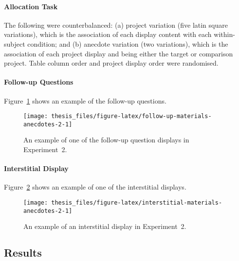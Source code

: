 \documentclass[a4paper, nobind]{templates/ociamthesis}
\theoremstyle{definition}
\theoremstyle{definition}
\theoremstyle{definition}
\theoremstyle{definition}
\theoremstyle{remark}
\begin{document}
\hypertarget{allocation-anecdotes-2-appendix}{%
\paragraph{Allocation Task}\label{allocation-anecdotes-2-appendix}}

The following were counterbalanced: (a) project variation (five latin square
variations), which is the association of each display content with each
within-subject condition; and (b) anecdote variation (two variations), which is
the association of each project display and being either the target or
comparison project. Table column order and project display order were
randomised.

\hypertarget{follow-up-materials-anecdotes-2}{%
\paragraph{Follow-up Questions}\label{follow-up-materials-anecdotes-2}}

Figure~\ref{fig:follow-up-materials-anecdotes-2} shows an example of the
follow-up questions.



\begin{figure}
\texttt{[image: thesis\_files/figure-latex/follow-up-materials-anecdotes-2-1]} \caption{An example of one of the follow-up question displays in Experiment~2.}\label{fig:follow-up-materials-anecdotes-2}
\end{figure}

\hypertarget{interstitial-materials-anecdotes-2}{%
\paragraph{Interstitial Display}\label{interstitial-materials-anecdotes-2}}

Figure~\ref{fig:interstitial-materials-anecdotes-2} shows an example of one of
the interstitial displays.



\begin{figure}
\texttt{[image: thesis\_files/figure-latex/interstitial-materials-anecdotes-2-1]} \caption{An example of an interstitial display in Experiment~2.}\label{fig:interstitial-materials-anecdotes-2}
\end{figure}

\hypertarget{results-anecdotes-2-appendix}{%
\subsection{Results}\label{results-anecdotes-2-appendix}}
\end{document}
